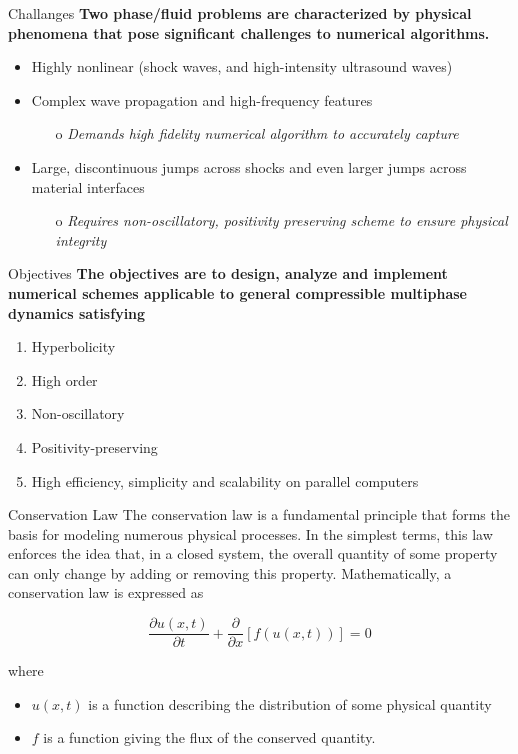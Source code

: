 \documentclass[9pt]{beamer}
\begin{document}
  \begin{frame}{Challanges}
\textbf{Two phase/fluid problems are characterized by physical phenomena that pose significant challenges to numerical algorithms.}
  \begin{itemize}
    \item Highly nonlinear (shock waves, and high-intensity ultrasound waves)
    \item Complex wave propagation and high-frequency features
        \begin{itemize}
          \item[o] \textit{Demands high fidelity numerical algorithm to accurately capture}
        \end{itemize}
    \item Large, discontinuous jumps across shocks and even larger jumps across material interfaces
        \begin{itemize}
          \item[o] \textit{Requires non-oscillatory, positivity preserving scheme to ensure physical integrity}
        \end{itemize}
  \end{itemize}  
  \end{frame}

  \begin{frame}{Objectives}
    \textbf{The objectives are to design, analyze and implement numerical schemes applicable to general compressible multiphase dynamics satisfying}
    \begin{enumerate}
      \item Hyperbolicity
      \item High order
      \item Non-oscillatory
      \item Positivity-preserving
      \item High efficiency, simplicity and scalability on parallel
      computers
    \end{enumerate}
  \end{frame}

\begin{frame}{Conservation Law}
  The conservation law is a fundamental principle that forms the basis for modeling numerous physical processes.  In the simplest terms, this law enforces the idea that, in a closed system, the overall quantity of some property can only change by adding or removing this property.  Mathematically, a conservation law is expressed as
  
  \begin{equation}
    \frac{\partial u(x,t)}{\partial t} + \frac{\partial}{\partial x}[f(u(x,t))]=0\label{eq:Conservation Law}
  \end{equation}
  
  where 
  \begin{itemize}
    \item $u(x,t)$ is a function describing the distribution of some physical quantity 
    \item $f$ is a function giving the flux of the conserved quantity.
  \end{itemize}

\end{frame}
\end{document}
